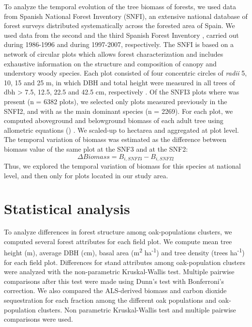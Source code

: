 To analyze the temporal evolution of the tree biomass of \Qp forests, we used data from Spanish National Forest Inventory (SNFI), an extensive national database of forest surveys distributed systematically across the forested area of Spain. We used data from the second \autocites[SNFI2][]{
VillaescusaDiaz1998SegundoInventario} and the third Spanish Forest Inventory \autocites[SNFI3][]{Villanueva2005TercerInventario}, carried out during 1986-1996 and during 1997-2007, respectively. The SNFI is based on a network of circular plots which allows forest characterization and includes exhaustive information on the structure and composition of canopy and understory woody species. Each plot consisted of four concentric circles of \emph{radii} 5, 10, 15 and 25 m, in which DBH and total height were measured in all trees of dbh \textgreater{} 7.5, 12.5, 22.5 and 42.5 cm, respectively \autocite{Alberdietal2016SpanishNational}. Of the SNFI3 plots where \Qp was present (n = 6382 plots), we selected only plots measured previously in the SNFI2, and with \Qp as the main dominant species (n = 2269). For each plot, we computed aboveground and belowground biomass of each \Qp adult tree using allometric equations () \autocite{RuizPeinadoetal2012BiomassModels}. We scaled-up to hectarea and aggregated at plot level. The temporal variation of biomass was estimated as the difference between biomass value of the same plot at the SNF3 and at the SNF2: \[\Delta Biomass = B_{i, SNFI3} - B_{i, SNFI2}\]
Thus, we explored the temporal variation of biomass for this species at national level, and then only for plots located in our study area.

\section{Statistical analysis}\label{sec:carbon:analysis}
To analyze differences in forest structure among oak-populations clusters, we computed several forest attributes for each field plot. We compute mean tree height (m), average DBH (cm), basal area (m\textsuperscript{2} ha\textsuperscript{-1}) and tree density (trees ha\textsuperscript{-1}) for each field plot. Differences for stand attributes among oak-population clusters were analyzed with the non-parametric Kruskal-Wallis test. Multiple pairwise comparisons after this test were made using Dunn's test with Bonferroni's correction. We also compared the ALS-derived biomass and carbon dioxide sequestration for each fraction among the different oak populations and oak-population clusters. Non parametric Kruskal-Wallis test and multiple pairwise comparisons were used.

